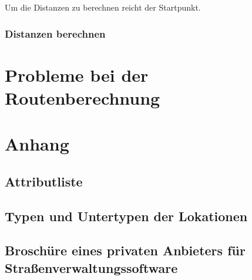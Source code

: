 \documentclass[12pt, a4paper, ngerman]{article}
\begin{document}
Um die Distanzen zu berechnen reicht der Startpunkt.

\subsubsection{Distanzen berechnen}



\section{Probleme bei der Routenberechnung \label{Probleme}}

\section{Anhang}
\subsection{Attributliste \label{bundAttributListe}}


\subsection{Typen und Untertypen der Lokationen \label{bundFeinDoku}}


\subsection{Broschüre eines privaten Anbieters für Straßenverwaltungssoftware \label{bundGDD}}

\end{document}

